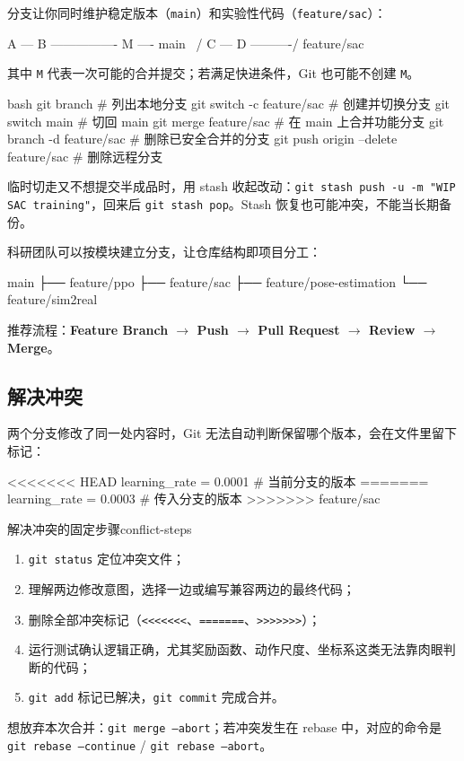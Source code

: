 \documentclass[12pt,a4paper]{ctexart}
\begin{document}
	分支让你同时维护稳定版本（\texttt{main}）和实验性代码（\texttt{feature/sac}）：

	\begin{codeblock}{}
A --- B ---------------- M ---- main
 \                    /
  C --- D ----------/      feature/sac
	\end{codeblock}

	其中 \texttt{M} 代表一次可能的合并提交；若满足快进条件，Git 也可能不创建 \texttt{M}。

	\begin{codeblock}{bash}
git branch                     # 列出本地分支
git switch -c feature/sac      # 创建并切换分支
git switch main                # 切回 main
git merge feature/sac          # 在 main 上合并功能分支
git branch -d feature/sac      # 删除已安全合并的分支
git push origin --delete feature/sac   # 删除远程分支
	\end{codeblock}

	临时切走又不想提交半成品时，用 stash 收起改动：\texttt{git stash push -u -m "WIP SAC training"}，回来后 \texttt{git stash pop}。Stash 恢复也可能冲突，不能当长期备份。

	科研团队可以按模块建立分支，让仓库结构即项目分工：

	\begin{codeblock}{}
main
├── feature/ppo
├── feature/sac
├── feature/pose-estimation
└── feature/sim2real
	\end{codeblock}

	推荐流程：\textbf{Feature Branch $\to$ Push $\to$ Pull Request $\to$ Review $\to$ Merge}。

	\subsection{解决冲突}

	两个分支修改了同一处内容时，Git 无法自动判断保留哪个版本，会在文件里留下标记：

	\begin{codeblock}{}
<<<<<<< HEAD
learning_rate = 0.0001        # 当前分支的版本
=======
learning_rate = 0.0003        # 传入分支的版本
>>>>>>> feature/sac
	\end{codeblock}

	\begin{example}{解决冲突的固定步骤}{conflict-steps}
		\begin{enumerate}[itemsep=0pt]
			\item \texttt{git status} 定位冲突文件；
			\item 理解两边修改意图，选择一边或编写兼容两边的最终代码；
			\item 删除全部冲突标记（\texttt{<<<<<<<}、\texttt{=======}、\texttt{>>>>>>>}）；
			\item 运行测试确认逻辑正确，尤其奖励函数、动作尺度、坐标系这类无法靠肉眼判断的代码；
			\item \texttt{git add} 标记已解决，\texttt{git commit} 完成合并。
		\end{enumerate}
		想放弃本次合并：\texttt{git merge --abort}；若冲突发生在 rebase 中，对应的命令是 \texttt{git rebase --continue} / \texttt{git rebase --abort}。
	\end{example}
\end{document}
